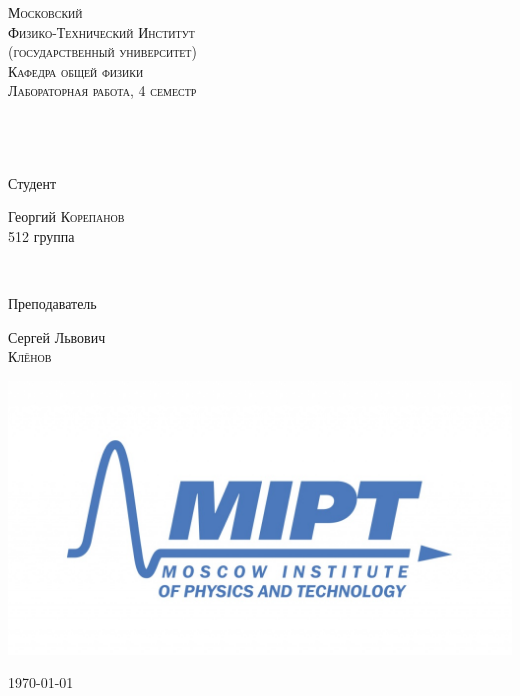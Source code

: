 \begin{titlepage}
\center %
 

\textsc{\LARGE Московский\\[-0.2cm]Физико-Технический Институт\\[0.1cm]\large (государственный университет)}\\[1.5cm] %
\textsc{\Large Кафедра общей физики}\\[0.1cm] %
\textsc{\large Лабораторная работа, 4 семестр}\\[0.5cm] %


\HRule
\\[0.8cm]
{ \huge \bfseries \LabTitle}
\\[0.8cm] %
\HRule
\\[1.5cm]


 

\begin{minipage}{0.4\textwidth}
	\begin{flushleft} \large
		\textsf{Студент}
		
		Георгий \textsc{Корепанов} \\[-0.15cm]
		512 группа
	\end{flushleft}
\end{minipage}
~
\begin{minipage}{0.4\textwidth}
	\begin{flushright} \large
		\textsf{Преподаватель}
		
		Сергей Львович\\[-0.15cm]
		\textsc{Клёнов} %
	\end{flushright}
\end{minipage}

\begin{bottompar}
	\begin{center}
		\includegraphics[width = 80 mm]{../tools/img/logo.jpg}
	\end{center}
	{\large \today}

\end{bottompar}
\vfill %

\end{titlepage}

